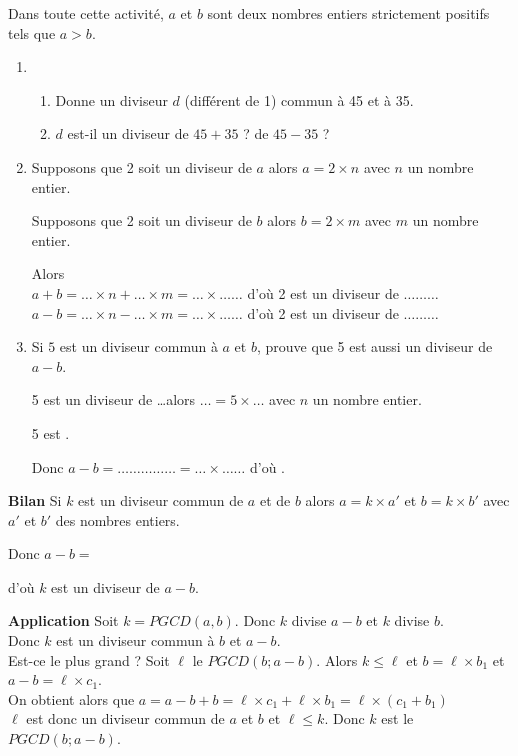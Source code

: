 
Dans toute cette activité, $a$ et $b$ sont deux nombres entiers strictement positifs tels que $a>b$.
\begin{enumerate}
\item\begin{enumerate}
\item Donne un diviseur $d$ (différent de 1) commun à 45 et à 35.
\item $d$ est-il un diviseur de $45+35$ ? de $45-35$ ?
\end{enumerate}
\item Supposons que 2 soit un diviseur de $a$ alors $a=2\times n$ avec $n$ un nombre entier.
\par Supposons que 2 soit un diviseur de $b$ alors $b=2\times m$ avec $m$ un nombre entier.
\par Alors \\ 
$a+b=\ldots\times n+\ldots\times m=\ldots\times\ldots\ldots$ \hspace{1cm} d'où 2 est un diviseur de $\ldots\ldots\ldots$\\
$a-b=\ldots\times n-\ldots\times m=\ldots\times\ldots\ldots$ \hspace{1cm} d'où 2 est un diviseur de $\ldots\ldots\ldots$
\item Si $5$ est un diviseur commun à $a$ et $b$, prouve que 5 est aussi un diviseur de $a-b$.
\par 5 est un diviseur de \ldots alors $\ldots=5\times\ldots$ avec $n$ un nombre entier.
\par 5 est \dotfill.
\par Donc $a-b=\ldots\ldots\ldots\ldots\ldots=\ldots\times\ldots\ldots$ d'où \dotfill.
\end{enumerate}
\textbf{Bilan} Si $k$ est un diviseur commun de $a$ et de $b$ alors $a=k\times a'$ et $b=k\times b'$ avec $a'$ et $b'$ des nombres entiers.
\par Donc $a-b=$\dotfill
\par d'où $k$ est un diviseur de $a-b$.
\par\textbf{Application} Soit $k=PGCD(a,b)$. Donc
$k$ divise $a-b$ et 
$k$ divise $b$. \\
Donc $k$ est un diviseur commun à $b$ et $a-b$.\\
Est-ce le plus grand ?
Soit $\ell$ le $PGCD(b;a-b)$. Alors $k\leqslant\ell$ et $b=\ell\times b_1$ et $a-b=\ell\times c_1$.
\\On obtient alors que
$a=a-b+b=\ell\times c_1+\ell\times b_1=\ell\times(c_1+b_1)$\\
$\ell$ est donc un diviseur commun de $a$ et $b$ et $\ell\leqslant k$.
Donc $k$ est le $PGCD(b;a-b)$.